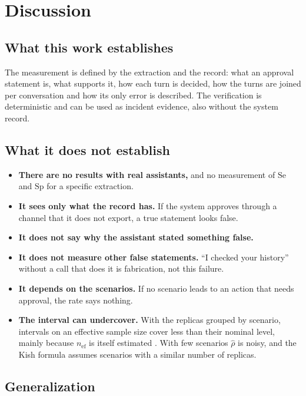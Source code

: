 \documentclass[11pt,a4paper]{article}
\begin{document}
\section{Discussion}

\subsection{What this work establishes}

The measurement is defined by the extraction and the record: what an approval statement is, what supports it, how
each turn is decided, how the turns are joined per conversation and how its only error is described. The
verification is deterministic and can be used as incident evidence, also without the system record.

\subsection{What it does not establish}

\begin{itemize}
  \item \textbf{There are no results with real assistants,} and no measurement of $\mathrm{Se}$ and $\mathrm{Sp}$
    for a specific extraction.
  \item \textbf{It sees only what the record has.} If the system approves through a channel that it does not
    export, a true statement looks false.
  \item \textbf{It does not say why the assistant stated something false.}
  \item \textbf{It does not measure other false statements.} ``I checked your history'' without a call that does it
    is fabrication, not this failure.
  \item \textbf{It depends on the scenarios.} If no scenario leads to an action that needs approval, the rate says
    nothing.
  \item \textbf{The interval can undercover.} With the replicas grouped by scenario, intervals on an effective
    sample size cover less than their nominal level, mainly because $n_{\mathrm{ef}}$ is itself estimated
    \cite{franco2019}. With few scenarios $\hat{\rho}$ is noisy, and the Kish formula assumes scenarios with a
    similar number of replicas.
\end{itemize}

\subsection{Generalization}
\end{document}
